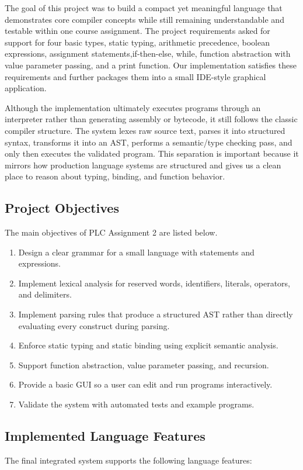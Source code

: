 \documentclass[12pt,a4paper]{article}
\begin{document}
The goal of this project was to build a compact yet meaningful language that demonstrates core compiler concepts while still remaining understandable and testable within one course assignment. The project requirements asked for support for four basic types, static typing, arithmetic precedence, boolean expressions, assignment statements,if-then-else, while, function abstraction with value parameter passing, and a print function. Our implementation satisfies these requirements and further packages them into a small IDE-style graphical application.

Although the implementation ultimately executes programs through an interpreter rather than generating assembly or bytecode, it still follows the classic compiler structure. The system lexes raw source text, parses it into structured syntax, transforms it into an AST, performs a semantic/type checking pass, and only then executes the validated program. This separation is important because it mirrors how production language systems are structured and gives us a clean place to reason about typing, binding, and function behavior.

\subsection{Project Objectives}
The main objectives of PLC Assignment 2 are listed below.

\begin{enumerate}[leftmargin=1.2cm]
    \item Design a clear grammar for a small language with statements and expressions.
    \item Implement lexical analysis for reserved words, identifiers, literals, operators, and delimiters.
    \item Implement parsing rules that produce a structured AST rather than directly evaluating every construct during parsing.
    \item Enforce static typing and static binding using explicit semantic analysis.
    \item Support function abstraction, value parameter passing, and recursion.
    \item Provide a basic GUI so a user can edit and run programs interactively.
    \item Validate the system with automated tests and example programs.
\end{enumerate}

\subsection{Implemented Language Features}
The final integrated system supports the following language features:
\end{document}
